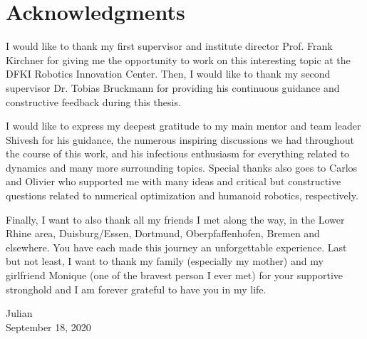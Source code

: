 \thispagestyle{empty}
\chapter*{Acknowledgments}
 
I would like to thank my first supervisor and institute director Prof. Frank Kirchner for giving me the opportunity to work on this interesting topic at the DFKI Robotics Innovation Center. Then, I would like to thank my second supervisor Dr. Tobias Bruckmann for providing his continuous guidance and constructive feedback during this thesis.   

I would like to express my deepest gratitude to my main mentor and team leader Shivesh for his guidance, the numerous inspiring discussions we had throughout the course of this work, and his infectious enthusiasm for everything related to dynamics and many more surrounding topics. Special thanks also goes to Carlos and Olivier who supported me with many ideas and critical but constructive questions related to numerical optimization and humanoid robotics, respectively. 

Finally, I want to also thank all my friends I met along the way, in the Lower Rhine area, Duisburg/Essen, Dortmund, %
Oberpfaffenhofen, Bremen and elsewhere. You have each made this journey an unforgettable experience. Last but not least, I want to thank my family (especially my mother) and my girlfriend Monique (one of the bravest person I ever met) for your supportive stronghold and I am forever grateful to have you in my life. 


\bigskip

\begin{flushright}
{\Large Julian} \\
\bigskip
September 18, 2020
\end{flushright}










